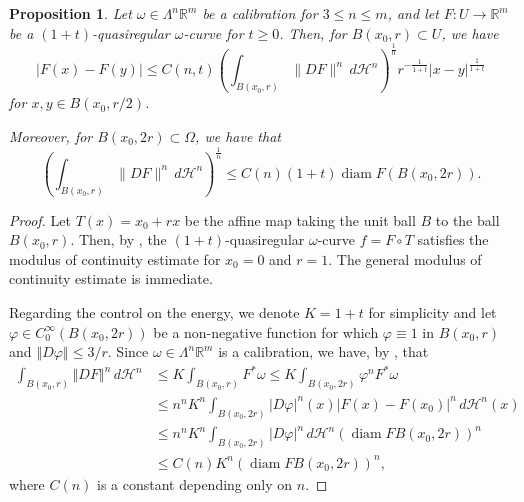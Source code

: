 \documentclass[a4paper,leqno,11pt]{amsart}
\numberwithin{equation}{section}
\newtheorem{proposition}[theorem]{Proposition}
\theoremstyle{remark}
\theoremstyle{remark}
\newcommand{\R}{\mathbb{R}}
\DeclareMathOperator{\diam}{diam}
\newcommand{\norm}[1]{ \left\Vert #1 \right\Vert }	%
\begin{document}
\begin{proposition}\label{prop:localcontinuity}
Let $\omega \in \Lambda^n \mathbb{R}^m$ be a calibration for $3 \leq n \leq m$, and let $F \colon U \to \mathbb{R}^m$ be a $(1+t)$-quasiregular $\omega$-curve for $t \geq 0$. Then, for $B( x_0, r ) \subset U$, we have
\begin{equation*}
    | F(x) - F(y) |
    \leq
    C(n,t)
    \left( 
        \int_{ B( x_0, r ) } \|DF\|^{n} \,d\mathcal{H}^n
    \right)^{ \frac{1}{n} }
    r^{ - \frac{1}{1+t} }
    | x - y |^{ \frac{1}{1+t} }
\end{equation*}
for $x, y \in B( x_0, r/2 )$.

Moreover, for $B( x_0, 2r ) \subset \Omega$, we have that
\begin{equation*}
    \left( \int_{ B( x_0, r ) } \|DF\|^n \,d\mathcal{H}^n \right)^{ \frac{1}{n} }
    \leq
    C(n) (1+t)
    \diam F(B(x_0,2r)).
\end{equation*}
\end{proposition}
\begin{proof}
Let $T(x) = x_0 + rx$ be the affine map taking the unit ball $B$ to the ball $B(x_0,r)$. Then, by \cite[Theorem 6.8]{Iko:23}, the $(1+t)$-quasiregular $\omega$-curve $f = F \circ T$ satisfies the modulus of continuity estimate for $x_0 = 0$ and $r = 1$. The general modulus of continuity estimate is immediate.

Regarding the control on the energy, we denote $K = 1+t$ for simplicity and let $\varphi \in C^\infty_0(B(x_0,2r))$ be a non-negative function for which $\varphi \equiv 1$ in $B(x_0,r)$ and $\norm{ D\varphi} \le 3/r$. Since $\omega\in \Lambda^n \R^m$ is a calibration, we have, by \cite[Lemma 6.1]{Onn:Pan:21}, that
\begin{align*}
\int_{ B(x_0,r)} \norm{DF}^n \,d\mathcal{H}^n 
&\le K\int_{B(x_0,r)} F^*\omega
\le K \int_{B(x_0,2r)} \varphi^n F^*\omega \\
&\le n^n K^{n} \int_{B(x_0,2r)} |D \varphi|^n(x) |F(x)-F(x_0)|^n  \,d\mathcal{H}^n(x) \\ 
&\le n^n K^n \int_{B(x_0,2r)} |D \varphi|^n \,d\mathcal{H}^n ( \diam FB(x_0,2r) )^{n} \\
&\le C(n) K^n ( \diam FB(x_0,2r) )^n,
\end{align*}
where $C(n)$ is a constant depending only on $n$.
\end{proof}

\end{document}
